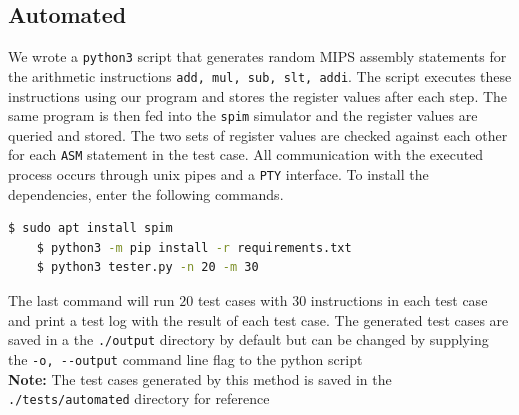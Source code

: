 \documentclass[hidelinks,12pt]{article}
\begin{document}
\subsection{Automated}
We wrote a \verb|python3| script that generates random MIPS assembly statements for the arithmetic instructions \verb|add, mul, sub, slt, addi|.
The script executes these instructions using our program and stores the register values after each step. The same program is then fed into the \verb|spim| simulator and
the register values are queried and stored. The two sets of register values are checked against each other for each \verb|ASM| statement in the test case.
All communication with the executed process occurs through unix pipes and a \verb|PTY| interface.
To install the dependencies, enter the following commands. \\[0.1cm]
\begin{lstlisting}[language=bash]
    $ sudo apt install spim
    $ python3 -m pip install -r requirements.txt
    $ python3 tester.py -n 20 -m 30 
\end{lstlisting}
The last command will run $20$ test cases with $30$ instructions in each test case and print a test log with the result of each test case.
The generated test cases are saved in a the \verb|./output| directory by default but can be changed by supplying the \verb|-o, --output| command line flag to the python script\\

\textbf{Note:} The test cases generated by this method is saved in the \verb|./tests/automated| directory for reference
\end{document}
